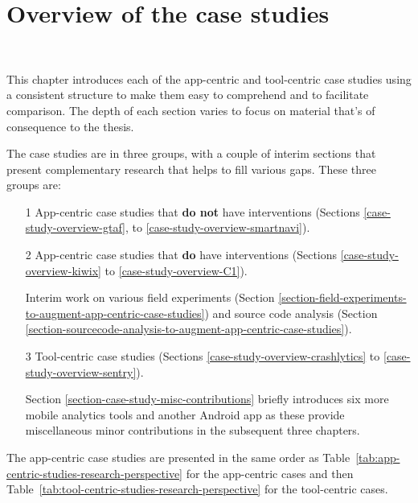 \setchapterpreamble[u]{\margintoc}
\chapter{Overview of the case studies}~\label{chapter-case-studies-overview}

This chapter introduces each of the app-centric and tool-centric case studies using a consistent structure to make them easy to comprehend and to facilitate comparison. The depth of each section varies to focus on material that's of consequence to the thesis. 

The case studies are in three groups, with a couple of interim sections that present complementary research that helps to fill various gaps. These three groups are: 
\begin{enumerate}
    \itemsep0em
    \item[1] App-centric case studies that \textbf{do not} have interventions (Sections \ref{case-study-overview-gtaf}, to \ref{case-study-overview-smartnavi}).
    \item[2] App-centric case studies that \textbf{do} have interventions (Sections \ref{case-study-overview-kiwix} to \ref{case-study-overview-C1}).
    \item[ ] Interim work on various field experiments (Section \ref{section-field-experiments-to-augment-app-centric-case-studies}) and source code analysis (Section \ref{section-sourcecode-analysis-to-augment-app-centric-case-studies}).
    \item[3] Tool-centric case studies (Sections \ref{case-study-overview-crashlytics} to \ref{case-study-overview-sentry}).
    \item[ ] Section \ref{section-case-study-misc-contributions} briefly introduces six more mobile analytics tools and another Android app as these provide miscellaneous minor contributions in the subsequent three chapters.
\end{enumerate}

The app-centric case studies are presented in the same order as Table~\ref{tab:app-centric-studies-research-perspective} for the app-centric cases and then Table~\ref{tab:tool-centric-studies-research-perspective} for the tool-centric cases. 

